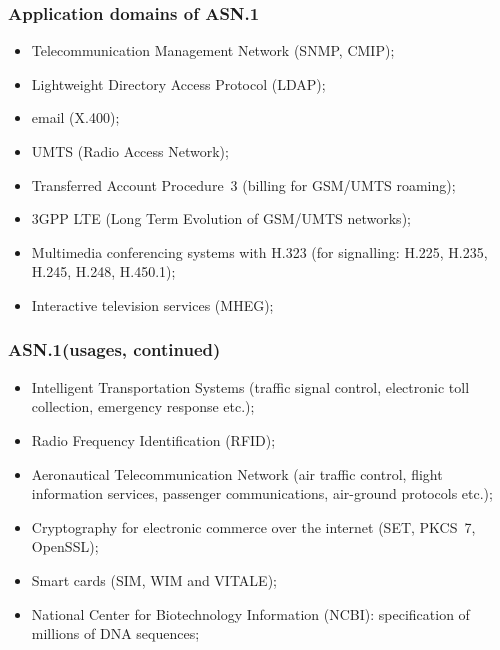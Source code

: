 \documentclass[compress,dvips,xcolor={dvipsnames},t]{beamer}
\newcommand\ASN{\textsf{ASN.1}\xspace}
\begin{document}
\begin{frame}
\frametitle{Application domains of \ASN}

\begin{itemize}

  \item Telecommunication Management Network (SNMP, CMIP);

  \item Lightweight Directory Access Protocol (LDAP);

  \item email (\textsf{X.400});

  \item \textsf{UMTS} (Radio Access Network);

  \item Transferred Account Procedure~3 (billing for
    \textsf{GSM/UMTS} roaming);

  \item \textsf{3GPP LTE} (Long Term Evolution of \textsf{GSM/UMTS}
    networks);

  \item Multimedia conferencing systems with \textsf{H.323} (for
    signalling: \textsf{H.225}, \textsf{H.235}, \textsf{H.245},
    \textsf{H.248}, \textsf{H.450.1});

  \item Interactive television services (\textsf{MHEG});

\end{itemize}

\end{frame}

\begin{frame}
\frametitle{\ASN (usages, continued)}

\begin{itemize}

  \item Intelligent Transportation Systems (traffic signal
  control, electronic toll collection, emergency response etc.);

  \item Radio Frequency Identification (RFID);

  \item Aeronautical Telecommunication Network (air traffic control,
    flight information services, passenger communications, air-ground
    protocols etc.);

  \item Cryptography for electronic commerce over the internet (SET,
    PKCS~7, OpenSSL);

  \item Smart cards (SIM, WIM and VITALE);

  \item National Center for Biotechnology Information (NCBI):
    specification of millions of DNA sequences;

\end{itemize}

\end{frame}
\end{document}
